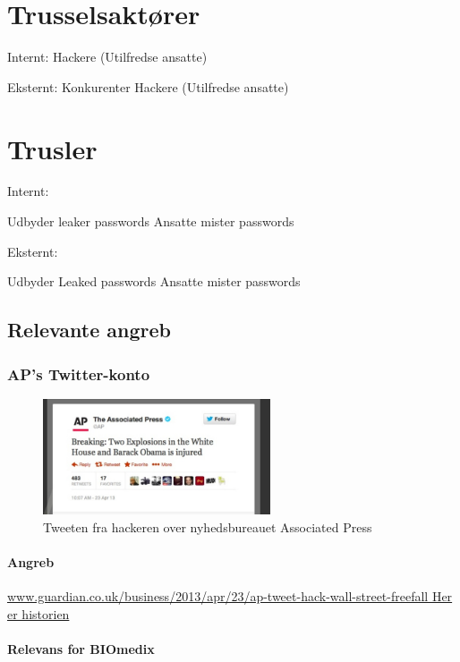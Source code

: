 \documentclass{article}
\begin{document}
\section{Trusselsaktører}

Internt:
Hackere
(Utilfredse ansatte)


Eksternt:
Konkurenter
Hackere
(Utilfredse ansatte)

\section{Trusler}

Internt:

Udbyder leaker passwords
Ansatte mister passwords

Eksternt:

Udbyder Leaked passwords
Ansatte mister passwords

\subsection{Relevante angreb}
\subsubsection{AP's Twitter-konto}

\begin{figure}
  \begin{center}
    \includegraphics[width=0.6\textwidth]{../Pictures/APTweet.jpg}
  \end{center}
  \caption{Tweeten fra hackeren over nyhedsbureauet Associated Press \cite{APTweetSource}}
\end{figure}

\paragraph{Angreb}
\url{www.guardian.co.uk/business/2013/apr/23/ap-tweet-hack-wall-street-freefall Her er historien}
\paragraph{Relevans for BIOmedix}
\end{document}
